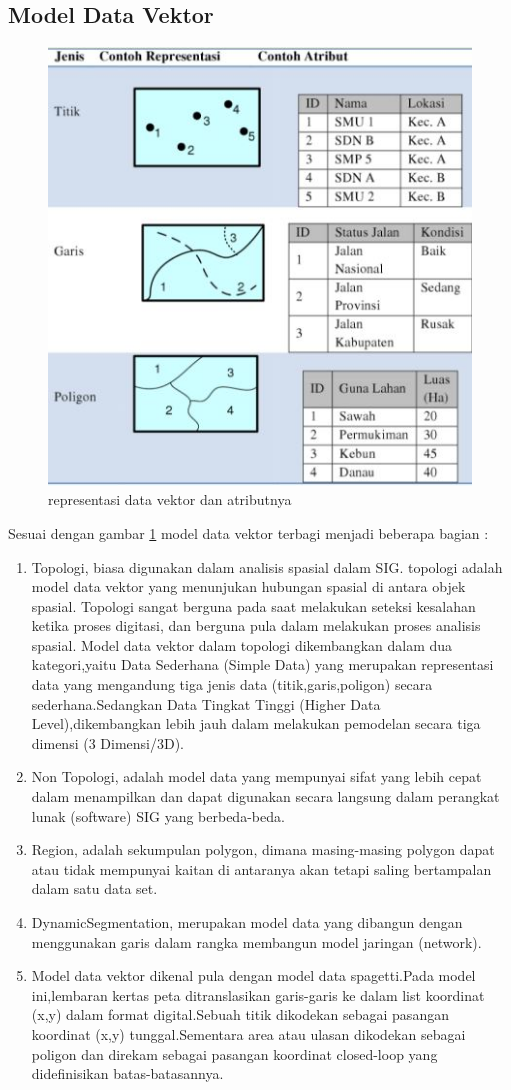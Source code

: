 \subsection{Model Data Vektor}
\begin{figure}[ht]
\centerline{\includegraphics[width=.5\textwidth] {figures/vektor03.JPG}}
\caption{representasi data vektor dan atributnya}
\label{vektor03}
\end{figure}
Sesuai dengan gambar \ref{vektor03} model data vektor terbagi menjadi beberapa bagian\cite{Janner2010rekayasa} :
\begin{enumerate} 
\item Topologi, biasa digunakan dalam analisis spasial dalam SIG. topologi adalah model data vektor yang menunjukan hubungan spasial di antara objek spasial. Topologi sangat berguna pada saat melakukan seteksi kesalahan ketika proses digitasi, dan berguna pula dalam melakukan proses analisis spasial.
Model data vektor dalam topologi dikembangkan dalam dua kategori,yaitu Data Sederhana (Simple Data) yang merupakan representasi data yang mengandung tiga jenis data (titik,garis,poligon) secara sederhana.Sedangkan Data Tingkat Tinggi (Higher Data Level),dikembangkan lebih jauh dalam melakukan pemodelan secara tiga dimensi (3 Dimensi/3D).
\item Non Topologi, adalah model data yang mempunyai sifat yang lebih cepat dalam menampilkan dan dapat digunakan secara langsung dalam perangkat lunak (software) SIG yang berbeda-beda.
\item Region, adalah sekumpulan polygon, dimana masing-masing polygon dapat atau tidak mempunyai kaitan di antaranya akan tetapi saling bertampalan dalam satu data set.
\item DynamicSegmentation, merupakan model data yang dibangun dengan menggunakan garis dalam rangka membangun model jaringan (network).
\item Model data vektor dikenal pula dengan model data spagetti.Pada model ini,lembaran kertas peta ditranslasikan garis-garis 
ke dalam list koordinat (x,y) dalam format digital.Sebuah titik dikodekan sebagai pasangan koordinat (x,y) tunggal.Sementara area atau ulasan dikodekan sebagai poligon dan direkam sebagai pasangan koordinat closed-loop yang didefinisikan batas-batasannya.
\end{enumerate}


